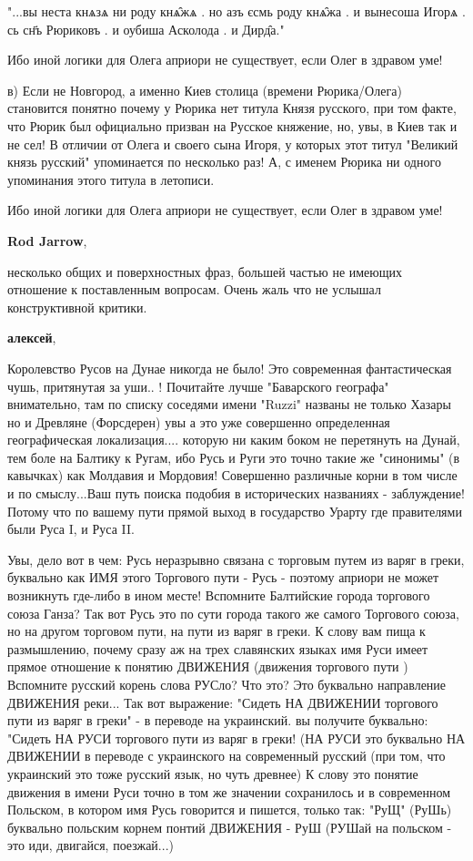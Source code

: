 \begin{itemize}
\begin{itemize}
"...вы неста кнѧзѧ ни роду кнѧ̑жѧ . но азъ єсмь роду кнѧ̑жа . и вынесоша Игорѧ .
сь сн҃ъ Рюриковъ . и оубиша Асколода . и Дирд̑а."

Ибо иной логики для Олега априори не существует, если Олег в здравом уме!

в) Если не Новгород, а именно Киев столица (времени Рюрика/Олега) становится
понятно почему у Рюрика нет титула Князя русского, при том факте, что Рюрик был
официально призван на Русское княжение, но, увы, в Киев так и не сел! В отличии
от Олега и своего сына Игоря, у которых этот титул "Великий князь русский"
упоминается по несколько раз! А, с именем Рюрика ни одного упоминания этого
титула в летописи.

Ибо иной логики для Олега априори не существует, если Олег в здравом уме!

\textbf{Rod Jarrow}, 

несколько общих и поверхностных фраз, большей частью не имеющих отношение к
поставленным вопросам. Очень жаль что не услышал конструктивной критики.

\textbf{алексей}, 

Королевство Русов на Дунае никогда не было! Это современная фантастическая
чушь, притянутая за уши.. ! Почитайте лучше "Баварского географа" внимательно,
там по списку соседями имени "Ruzzi" названы не только Хазары но и Древляне
(Форсдерен) увы а это уже совершенно определенная географическая
локализация.... которую ни каким боком не перетянуть на Дунай, тем боле на
Балтику к Ругам, ибо Русь и Руги это точно такие же "синонимы" (в кавычках) как
Молдавия и Мордовия! Совершенно различные корни в том числе и по смыслу...Ваш
путь поиска подобия в исторических названиях - заблуждение! Потому что по
вашему пути прямой выход в государство Урарту где правителями были Руса I, и
Руса II.

Увы, дело вот в чем: Русь неразрывно связана с торговым путем из варяг в греки,
буквально как ИМЯ этого Торгового пути - Русь - поэтому априори не может
возникнуть где-либо в ином месте! Вспомните Балтийские города торгового союза
Ганза? Так вот Русь это по сути города такого же самого Торгового союза, но на
другом торговом пути, на пути из варяг в греки. К слову вам пища к размышлению,
почему сразу аж на трех славянских языках имя Руси имеет прямое отношение к
понятию ДВИЖЕНИЯ (движения торгового пути ) Вспомните русский корень слова
РУСло? Что это? Это буквально направление ДВИЖЕНИЯ реки... Так вот выражение:
"Сидеть НА ДВИЖЕНИИ торгового пути из варяг в греки" - в переводе на
украинский. вы получите буквально: "Сидеть НА РУСИ торгового пути из варяг в
греки! (НА РУСИ это буквально НА ДВИЖЕНИИ в переводе с украинского на
современный русский (при том, что украинский это тоже русский язык, но чуть
древнее) К слову это понятие движения в имени Руси точно в том же значении
сохранилось и в современном Польском, в котором имя Русь говорится и пишется,
только так: "РуЩ" (РуШь) буквально польским корнем понтий ДВИЖЕНИЯ - РуШ (РУШай
на польском - это иди, двигайся, поезжай...)


\end{itemize}
\end{itemize}
